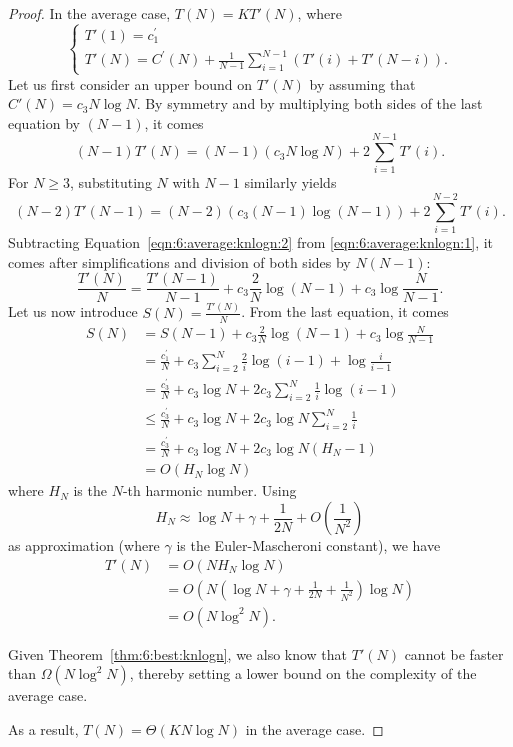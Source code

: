 \begin{proof}
In the average case, $T(N) = K T'(N)$, where
\begin{equation}
\begin{cases}
T'(1) = c_1^\prime \\
T'(N) = C^\prime(N) +  \frac{1}{N-1} \sum_{i=1}^{N-1} ( T'(i) + T'(N-i) ).
\end{cases}
\end{equation}
Let us first consider an upper bound on $T'(N)$ by assuming that $C'(N) = c_3 N\log N$.
By symmetry and by multiplying both sides of the last equation by $(N-1)$, it comes
\begin{equation}\label{eqn:6:average:knlogn:1}
(N-1) T'(N) = (N-1)(c_3 N\log N) +  2 \sum_{i=1}^{N-1} T'(i).
\end{equation}
For $N \geq 3$, substituting $N$ with $N-1$ similarly yields
\begin{equation}\label{eqn:6:average:knlogn:2}
(N-2) T'(N-1) = (N-2)(c_3 (N-1) \log(N-1)) +  2 \sum_{i=1}^{N-2} T'(i).
\end{equation}
Subtracting Equation~\ref{eqn:6:average:knlogn:2} from \ref{eqn:6:average:knlogn:1},
it comes after simplifications and division of both sides by $N(N-1)$:
\begin{equation}
\frac{T'(N)}{N} = \frac{T'(N-1)}{N-1} + c_3 \frac{2}{N} \log(N-1) + c_3 \log \frac{N}{N-1}.
\end{equation}
Let us now introduce $S(N) = \frac{T'(N)}{N}$. From the last equation, it comes
\begin{align}
S(N) &= S(N-1) + c_3 \frac{2}{N} \log(N-1) + c_3 \log \frac{N}{N-1} \nonumber \\
     &= \frac{c_1^\prime}{N} + c_3 \sum_{i=2}^N \frac{2}{i} \log(i-1) + \log \frac{i}{i-1}  \nonumber \\
     &= \frac{c_3^\prime}{N} + c_3 \log N + 2 c_3 \sum_{i=2}^N \frac{1}{i} \log(i-1)  \nonumber \\
     &\leq \frac{c_3^\prime}{N} + c_3 \log N + 2 c_3 \log N \sum_{i=2}^N \frac{1}{i}  \nonumber \\
     &= \frac{c_3^\prime}{N} + c_3 \log N + 2 c_3 \log N (H_N - 1)  \nonumber \\
     &= O(H_N \log N)
\end{align}
where $H_N$ is the $N$-th harmonic number. Using
\begin{equation}
H_N \approx \log N + \gamma + \frac{1}{2N} + O(\frac{1}{N^2})
\end{equation}
as approximation (where $\gamma$ is the Euler-Mascheroni constant), we have
\begin{align*}
T'(N) &= O(N H_N \log N) \nonumber \\
      &= O(N (\log N + \gamma + \frac{1}{2N} + \frac{1}{N^2}) \log N  ) \nonumber \\
      &= O(N \log^2 N).
\end{align*}

Given Theorem~\ref{thm:6:best:knlogn}, we also know that $T'(N)$ cannot be
faster than $\Omega(N \log^2 N)$, thereby setting a lower bound on the complexity
of the average case.

As a result, $T(N) = \Theta(KN\log N)$ in the average case.
\end{proof}

